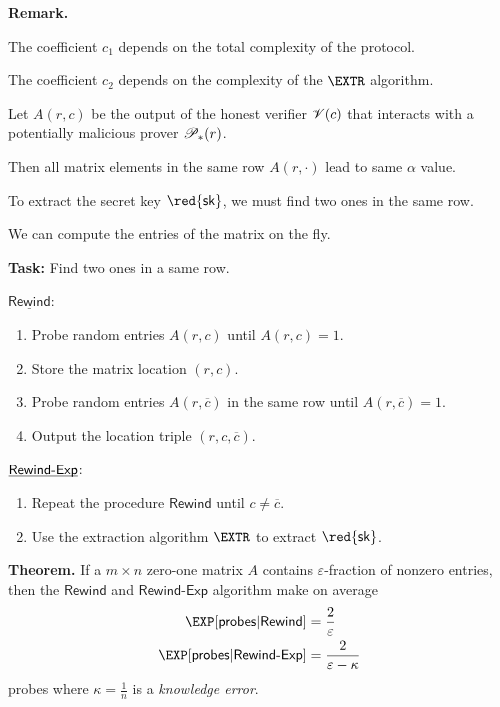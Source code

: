 \documentclass[landscape,footrule]{foils}
\newcommand{\probes}{\mathsf{probes}}
\renewcommand{\SK}{{\red{\mathsf{sk}}}}
\begin{document}
\textbf{Remark.} 
\begin{triangles}
\item The coefficient $c_1$ depends on the total complexity of the protocol.
\item The coefficient $c_2$ depends on the complexity of the $\EXTR$
  algorithm.
\end{triangles}




Let $A(r,c)$ be the output of the honest verifier $\mathscr{V}(c)$ that
interacts with a potentially malicious prover $\mathscr{P}_*(r)$.
\begin{triangles}
\item Then all matrix elements in the same row $A(r,\cdot)$ lead to same $\alpha$ value.
\item To extract the secret key $\SK$, we must find two ones in the same row.
\item We can compute the entries of the matrix on the fly.
\end{triangles}
 


\textbf{Task:} Find two ones in a same row.

$\underline{\mathsf{Rewind}}$:
\begin{enumerate}
 \item Probe random entries $A(r,c)$ until $A(r,c)=1$.
 \item Store the matrix location $(r,c)$.
 \item Probe random entries $A(r,\overline{c})$ in the same row until $A(r,\overline{c})=1$.
 \item Output the location triple $(r,c,\overline{c})$.
\end{enumerate}
\vspace*{2cm}

$\underline{\smash{\mathsf{Rewind\text{-}Exp}}}$:
\begin{enumerate}
  \item Repeat the procedure $\mathsf{Rewind}$ until $c\neq \overline{c}$.
  \item Use the extraction algorithm $\EXTR$ to extract $\SK$.
\end{enumerate}


\textbf{Theorem.}  If a $m\times n$ zero-one matrix $A$ contains
$\varepsilon$-fraction of nonzero entries, then the $\mathsf{Rewind}$
and $\mathsf{Rewind\text{-}Exp}$ algorithm make on average
\begin{align*}
  \EXP[\probes| \mathsf{Rewind}] &=\frac{2}{\varepsilon}\\
  \EXP[\probes|\mathsf{Rewind\text{-}Exp}] &=\frac{2}{\varepsilon-\kappa}
\end{align*}
probes where $\kappa=\frac{1}{n}$ is a \emph{knowledge error}.
\end{document}
